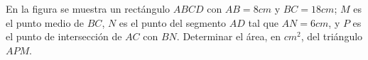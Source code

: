En la figura se muestra un rectángulo $ABCD$ con $AB = 8 cm$ y $BC = 18 cm$; $M$ es el punto medio de $BC$, $N$ es el punto del segmento $AD$ tal que $AN = 6 cm$, y $P$ es el punto de intersección de $AC$ con $BN$. Determinar el área, en $cm^2$, del triángulo $APM$.